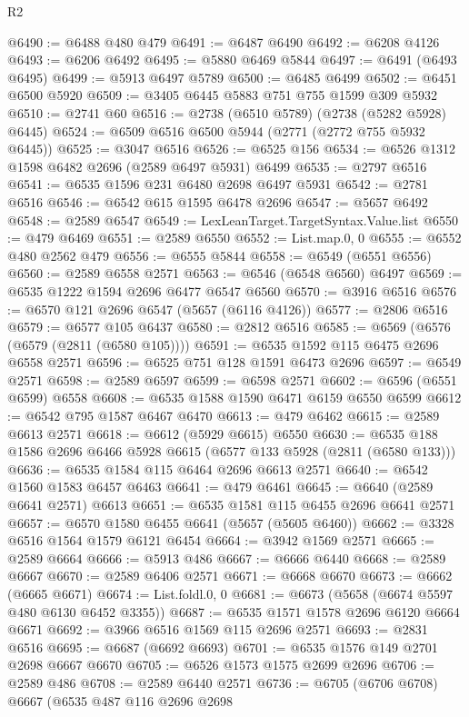 \begin{lexlean}{R2}
\begin{coremodule}
@6490 := @6488 @480 @479
@6491 := @6487 @6490
@6492 := @6208 @4126
@6493 := @6206 @6492
@6495 := @5880 @6469 @5844
@6497 := @6491 (@6493 @6495)
@6499 := @5913 @6497 @5789
@6500 := @6485 @6499
@6502 := @6451 @6500 @5920
@6509 := @3405 @6445 @5883 @751 @755 @1599 @309 @5932
@6510 := @2741 @60
@6516 := @2738 (@6510 @5789) (@2738 (@5282 @5928) @6445)
@6524 := @6509 @6516 @6500 @5944 (@2771 (@2772 @755 @5932 @6445))
@6525 := @3047 @6516
@6526 := @6525 @156
@6534 := @6526 @1312 @1598 @6482 @2696 (@2589 @6497 @5931) @6499
@6535 := @2797 @6516
@6541 := @6535 @1596 @231 @6480 @2698 @6497 @5931
@6542 := @2781 @6516
@6546 := @6542 @615 @1595 @6478 @2696
@6547 := @5657 @6492
@6548 := @2589 @6547
@6549 := LexLeanTarget.TargetSyntax.Value.list
@6550 := @479 @6469
@6551 := @2589 @6550
@6552 := List.map.{0, 0}
@6555 := @6552 @480 @2562 @479
@6556 := @6555 @5844
@6558 := @6549 (@6551 @6556)
@6560 := @2589 @6558 @2571
@6563 := @6546 (@6548 @6560) @6497
@6569 := @6535 @1222 @1594 @2696 @6477 @6547 @6560
@6570 := @3916 @6516
@6576 := @6570 @121 @2696 @6547 (@5657 (@6116 @4126))
@6577 := @2806 @6516
@6579 := @6577 @105 @6437
@6580 := @2812 @6516
@6585 := @6569 (@6576 (@6579 (@2811 (@6580 @105))))
@6591 := @6535 @1592 @115 @6475 @2696 @6558 @2571
@6596 := @6525 @751 @128 @1591 @6473 @2696
@6597 := @6549 @2571
@6598 := @2589 @6597
@6599 := @6598 @2571
@6602 := @6596 (@6551 @6599) @6558
@6608 := @6535 @1588 @1590 @6471 @6159 @6550 @6599
@6612 := @6542 @795 @1587 @6467 @6470
@6613 := @479 @6462
@6615 := @2589 @6613 @2571
@6618 := @6612 (@5929 @6615) @6550
@6630 := @6535 @188 @1586 @2696 @6466 @5928 @6615 (@6577 @133 @5928 (@2811 (@6580 @133)))
@6636 := @6535 @1584 @115 @6464 @2696 @6613 @2571
@6640 := @6542 @1560 @1583 @6457 @6463
@6641 := @479 @6461
@6645 := @6640 (@2589 @6641 @2571) @6613
@6651 := @6535 @1581 @115 @6455 @2696 @6641 @2571
@6657 := @6570 @1580 @6455 @6641 (@5657 (@5605 @6460))
@6662 := @3328 @6516 @1564 @1579 @6121 @6454
@6664 := @3942 @1569 @2571
@6665 := @2589 @6664
@6666 := @5913 @486
@6667 := @6666 @6440
@6668 := @2589 @6667
@6670 := @2589 @6406 @2571
@6671 := @6668 @6670
@6673 := @6662 (@6665 @6671)
@6674 := List.foldl.{0, 0}
@6681 := @6673 (@5658 (@6674 @5597 @480 @6130 @6452 @3355))
@6687 := @6535 @1571 @1578 @2696 @6120 @6664 @6671
@6692 := @3966 @6516 @1569 @115 @2696 @2571
@6693 := @2831 @6516
@6695 := @6687 (@6692 @6693)
@6701 := @6535 @1576 @149 @2701 @2698 @6667 @6670
@6705 := @6526 @1573 @1575 @2699 @2696
@6706 := @2589 @486
@6708 := @2589 @6440 @2571
@6736 := @6705
    (@6706 @6708)
    @6667
    (@6535
      @487
      @116
      @2696
      @2698

\end{coremodule}
\end{lexlean}
